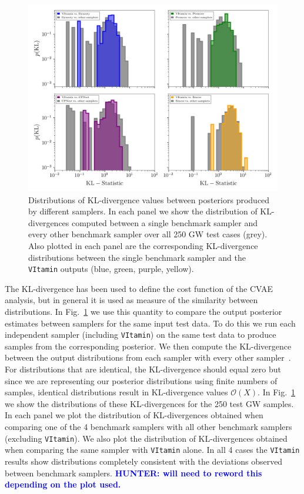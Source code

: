 \documentclass[%
showpacs,
nofootinbib,
 amsmath,amssymb,
 aps,
 twocolumn,
 prl,
 reprint,
floatfix,
]{revtex4-1}
\newcommand{\hunter}[1]{\textbf{\textcolor{blue}{HUNTER: #1}}}
\begin{document}
%
\begin{figure}
    \includegraphics[width=\textwidth]{hist-kl.png}
    \caption{\label{fig:kl_results} Distributions of \ac{KL}-divergence values
between posteriors produced by different samplers. In each panel we show the
distribution of \ac{KL}-divergences computed between a single benchmark sampler
and every other benchmark sampler over all 250 \ac{GW} test cases (grey). Also
plotted in each panel are the corresponding \ac{KL}-divergence distributions
between the single benchmark sampler and the \texttt{VItamin} outputs (blue,
green, purple, yellow).}

\end{figure}
%

%
%
The \ac{KL}-divergence has been used to define the cost function of the
\ac{CVAE} analysis, but in general it is used as measure of the similarity
between distributions. In Fig.~\ref{fig:kl_results} we use this quantity to
compare the output posterior estimates between samplers for the same input test
data. To do this we run each independent sampler (including \texttt{VItamin})
on the same test data to produce samples from the corresponding posterior. We
then compute the \ac{KL}-divergence between the output distributions from each
sampler with every other sampler~\cite{4839047}.  For distributions that are
identical, the \ac{KL}-divergence {should} equal zero but since we are
representing our posterior distributions using finite numbers of samples,
identical distributions result in \ac{KL}-divergence values $\mathcal{O}(X)$.
In Fig.~\ref{fig:kl_results} we show the distributions of these
\ac{KL}-divergences for the 250 test \ac{GW} samples. In each panel we plot the
distribution of \ac{KL}-divergences obtained when comparing one of the 4
benchmark samplers with all other benchmark samplers (excluding
\texttt{VItamin}). We also plot the distribution of \ac{KL}-divergences
obtained when comparing the same sampler with \texttt{VItamin} alone. In all 4
cases the \texttt{VItamin} results show distributions completely consistent
with the deviations observed between benchmark samplers. \hunter{will need to 
reword this depending on the plot used.}  


\end{document}
